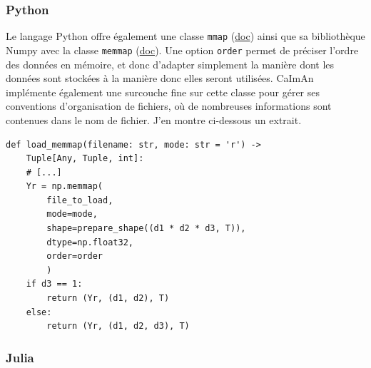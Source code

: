 \subsubsection{Python}

Le langage Python offre également une classe \verb|mmap| (\href{https://docs.python.org/3.8/library/mmap.html}{doc}) ainsi que sa bibliothèque Numpy avec la classe \verb|memmap| (\href{https://numpy.org/devdocs/reference/generated/numpy.memmap.html}{doc}). Une option \verb|order| permet de préciser l'ordre des données en mémoire, et donc d'adapter simplement la manière dont les données sont stockées à la manière donc elles seront utilisées. CaImAn implémente également une surcouche fine sur cette classe pour gérer ses conventions d'organisation de fichiers, où de nombreuses informations sont contenues dans le nom de fichier. J'en montre ci-dessous un extrait.

\pythonstyle
\begin{lstlisting}
def load_memmap(filename: str, mode: str = 'r') ->
    Tuple[Any, Tuple, int]:
    # [...]
    Yr = np.memmap(
        file_to_load,
        mode=mode,
        shape=prepare_shape((d1 * d2 * d3, T)),
        dtype=np.float32,
        order=order
        )
    if d3 == 1:
        return (Yr, (d1, d2), T)
    else:
        return (Yr, (d1, d2, d3), T)
\end{lstlisting}


\subsubsection{Julia}

